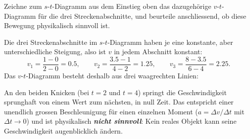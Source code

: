 \documentclass[addpoints,11pt,a4paper]{exam}
\newlength{\antwortraumlen}
\newcommand{\Antwortraum}[1]{%
  \pgfmathsetlength{\antwortraumlen}{#1*2.5cm}%
  \begin{answerbox}
    \rule{0pt}{\antwortraumlen}%
  \end{answerbox}%
}
\begin{document}
\begin{questions}
\begin{taskbox}
\question[4] Zeichne zum $s$-$t$-Diagramm aus dem Einstieg oben das
dazugehörige $v$-$t$-Diagramm für die drei Streckenabschnitte, und
beurteile anschliessend, ob diese Bewegung physikalisch sinnvoll ist.

\begin{center}
\end{center}

\Antwortraum{4}
\begin{solution}
Die drei Streckenabschnitte im $s$-$t$-Diagramm haben je eine konstante,
aber unterschiedliche Steigung, also ist $v$ in jedem Abschnitt konstant:
\[
  v_1=\frac{1-0}{2-0}=0.5, \qquad
  v_2=\frac{3.5-1}{4-2}=1.25, \qquad
  v_3=\frac{8-3.5}{6-4}=2.25.
\]
Das $v$-$t$-Diagramm besteht deshalb aus drei waagrechten Linien:

\begin{center}
\end{center}

An den beiden Knicken (bei $t=2$ und $t=4$) springt die Geschwindigkeit
sprunghaft von einem Wert zum nächsten, in null Zeit. Das entspricht
einer unendlich grossen Beschleunigung für einen einzelnen Moment
($a=\Delta v/\Delta t$ mit $\Delta t \to 0$) und ist physikalisch
\textbf{\emph{nicht sinnvoll}}: Kein reales Objekt kann seine
Geschwindigkeit augenblicklich ändern.
\end{solution}
\end{taskbox}
\end{questions}
\end{document}

